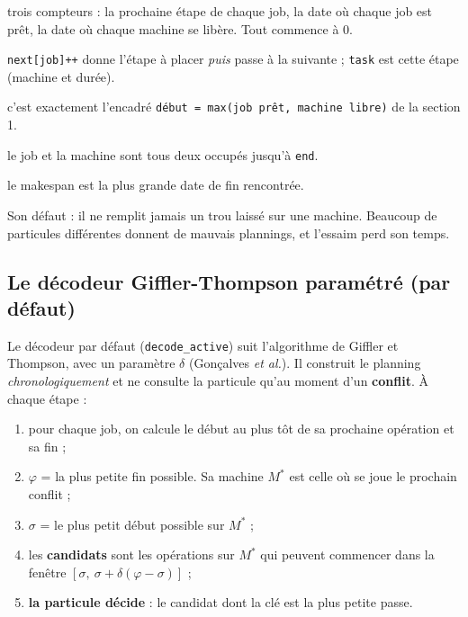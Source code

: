 \documentclass[11pt,a4paper]{article}
\newcommand{\code}[4]{%
  \needspace{10\baselineskip}%
  }
\newcommand{\li}[1]{\textcolor{jzero}{\textbf{l.\,#1}}}
\newenvironment{lignes}{\begin{description}[style=multiline,leftmargin=2.1cm,font=\normalfont,itemsep=2pt]\small}{\end{description}}
\begin{document}
\code{src/schedule.cpp}{20}{38}{le décodeur semi-actif}
\begin{lignes}
  \item[\li{20--22}] trois compteurs : la prochaine étape de chaque job, la date où chaque job
        est prêt, la date où chaque machine se libère. Tout commence à 0.
  \item[\li{27--28}] \texttt{next[job]++} donne l'étape à placer \emph{puis} passe à la
        suivante ; \texttt{task} est cette étape (machine et durée).
  \item[\li{31}] c'est exactement l'encadré
        \texttt{début = max(job prêt, machine libre)} de la section 1.
  \item[\li{34--35}] le job et la machine sont tous deux occupés jusqu'à \texttt{end}.
  \item[\li{36}] le makespan est la plus grande date de fin rencontrée.
\end{lignes}

Son défaut : il ne remplit jamais un \og trou \fg{} laissé sur une machine. Beaucoup de
particules différentes donnent de mauvais plannings, et l'essaim perd son temps.

\subsection{Le décodeur Giffler-Thompson paramétré (par défaut)}

Le décodeur par défaut (\texttt{decode\_active}) suit l'algorithme de Giffler et Thompson,
avec un paramètre $\delta$ (Gonçalves \emph{et al.}). Il construit le planning
\emph{chronologiquement} et ne consulte la particule qu'au moment d'un \textbf{conflit}.
À chaque étape :

\begin{enumerate}
  \item pour chaque job, on calcule le début au plus tôt de sa prochaine opération et sa fin ;
  \item $\varphi$ = la plus petite fin possible. Sa machine $M^*$ est celle où se joue le
        prochain conflit ;
  \item $\sigma$ = le plus petit début possible sur $M^*$ ;
  \item les \textbf{candidats} sont les opérations sur $M^*$ qui peuvent commencer dans la
        fenêtre $[\sigma,\ \sigma + \delta(\varphi-\sigma)]$ ;
  \item \textbf{la particule décide} : le candidat dont la clé est la plus petite passe.
\end{enumerate}
\end{document}
